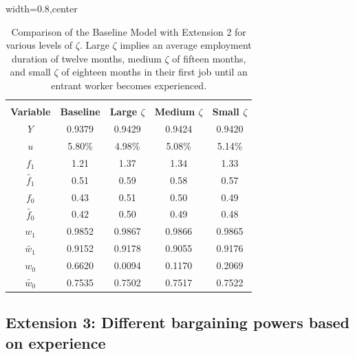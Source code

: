 \documentclass[12pt]{article} %
\theoremstyle{definition}
\begin{document}
\begin{table}[h!]
\begin{adjustbox}{width=0.8\columnwidth,center}

 \begin{tabular}{||c c c c c||} 
 \hline
 \\[-1.1em]
 \textbf{Variable} & \textbf{Baseline} & \textbf{Large $\zeta$} & \textbf{Medium $\zeta$} & \textbf{Small $\zeta$}\\  
 \hline\hline
  $Y$  & 0.9379 & 0.9429 & 0.9424 & 0.9420 \\ 
  $u$  & 5.80\% & 4.98\% & 5.08\% & 5.14\%\\ 
  $f_{1}$  & 1.21 & 1.37 & 1.34 & 1.33\\ 
  $\tilde{f_{1}}$  & 0.51 & 0.59 & 0.58 & 0.57\\
  $f_{0}$  &  0.43 & 0.51 & 0.50 & 0.49\\
  $\tilde{f_{0}}$  & 0.42 & 0.50 & 0.49 & 0.48\\
  $w_{1}$  & 0.9852 & 0.9867 & 0.9866 & 0.9865\\
  $\tilde{w_{1}}$ & 0.9152 & 0.9178 & 0.9055 & 0.9176\\
  $w_{0}$  & 0.6620 & 0.0094 & 0.1170 & 0.2069\\
  $\tilde{w_{0}}$ & 0.7535 & 0.7502 & 0.7517 &  0.7522\\ [1ex] 
 \hline
 \end{tabular}
\end{adjustbox}
\centering
     \captionsetup{justification=centering}
\caption{Comparison of the Baseline Model with Extension 2 for various levels of $\zeta$. Large $\zeta$ implies an average employment duration of twelve months, medium $\zeta$ of fifteen months, and small $\zeta$ of eighteen months in their first job until an entrant worker becomes experienced.} \label{table_ext2}
\end{table} 


\subsection{Extension 3: Different bargaining powers based on experience}
\end{document}
